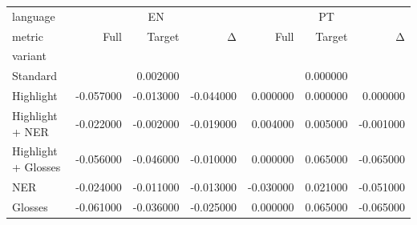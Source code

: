 \begin{tabular}{lrrrrrr}
\toprule
language & \multicolumn{3}{c}{EN} & \multicolumn{3}{c}{PT} \\
metric & Full & Target & Δ & Full & Target & Δ \\
variant &  &  &  &  &  &  \\
\midrule
Standard &  & 0.002000 &  &  & 0.000000 &  \\
Highlight & -0.057000 & -0.013000 & -0.044000 & 0.000000 & 0.000000 & 0.000000 \\
Highlight + NER & -0.022000 & -0.002000 & -0.019000 & 0.004000 & 0.005000 & -0.001000 \\
Highlight + Glosses & -0.056000 & -0.046000 & -0.010000 & 0.000000 & 0.065000 & -0.065000 \\
NER & -0.024000 & -0.011000 & -0.013000 & -0.030000 & 0.021000 & -0.051000 \\
Glosses & -0.061000 & -0.036000 & -0.025000 & 0.000000 & 0.065000 & -0.065000 \\
\bottomrule
\end{tabular}
